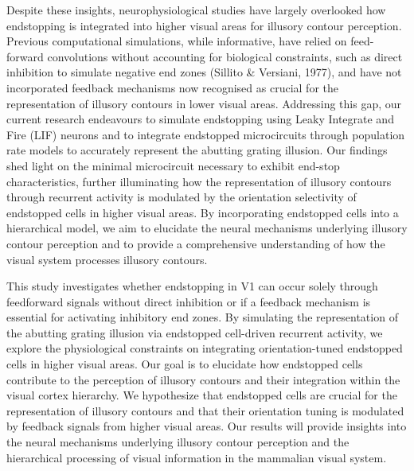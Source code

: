 \documentclass[12pt]{article}
\begin{document}

Despite these insights, neurophysiological studies have largely overlooked how endstopping is integrated into higher visual areas for illusory contour perception. Previous computational simulations, while informative, have relied on feed-forward convolutions without accounting for biological constraints, such as direct inhibition to simulate negative end zones (Sillito \& Versiani, 1977), and have not incorporated feedback mechanisms now recognised as crucial for the representation of illusory contours in lower visual areas. Addressing this gap, our current research endeavours to simulate endstopping using Leaky Integrate and Fire (LIF) neurons and to integrate endstopped microcircuits through population rate models to accurately represent the abutting grating illusion. Our findings shed light on the minimal microcircuit necessary to exhibit end-stop characteristics, further illuminating how the representation of illusory contours through recurrent activity is modulated by the orientation selectivity of endstopped cells in higher visual areas. By incorporating endstopped cells into a hierarchical model, we aim to elucidate the neural mechanisms underlying illusory contour perception and to provide a comprehensive understanding of how the visual system processes illusory contours.

This study investigates whether endstopping in V1 can occur solely through feedforward signals without direct inhibition or if a feedback mechanism is essential for activating inhibitory end zones. By simulating the representation of the abutting grating illusion via endstopped cell-driven recurrent activity, we explore the physiological constraints on integrating orientation-tuned endstopped cells in higher visual areas. Our goal is to elucidate how endstopped cells contribute to the perception of illusory contours and their integration within the visual cortex hierarchy. We hypothesize that endstopped cells are crucial for the representation of illusory contours and that their orientation tuning is modulated by feedback signals from higher visual areas. Our results will provide insights into the neural mechanisms underlying illusory contour perception and the hierarchical processing of visual information in the mammalian visual system.


\newpage
\end{document}
